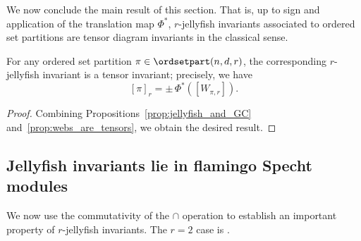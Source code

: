 We now conclude the main result of this section.
That is, up to sign and application of the translation map $\Phi^*$, $r$-jellyfish invariants associated to ordered set partitions are tensor diagram invariants in the classical sense. 
\begin{theorem}
For any ordered set partition $\pi \in \ordsetpart(n,d,r)$, the corresponding $r$-jellyfish invariant is a tensor invariant; precisely, we have \[[\pi]_r = \pm \, \Phi^*([W_{\pi,r}]).\]
\end{theorem}
\begin{proof}
    Combining Propositions~\ref{prop:jellyfish_and_GC} and~\ref{prop:webs_are_tensors}, we obtain the desired result.
\end{proof}

\subsection{Jellyfish invariants lie in flamingo Specht modules}

We now use the commutativity of the $\cap$ operation to establish an important property of $r$-jellyfish invariants. The $r=2$ case is \cite[Lemma~3.14]{Patrias.Pechenik.Striker}.

